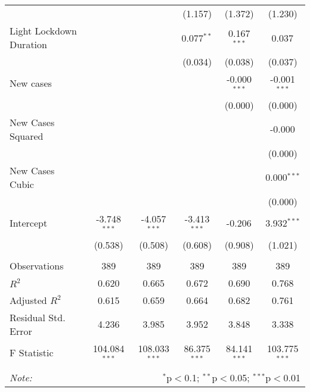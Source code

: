 \begin{tabular}{@{\extracolsep{5pt}}lccccc}
  & & & (1.157) & (1.372) & (1.230) \\
 Light Lockdown Duration & & & 0.077$^{**}$ & 0.167$^{***}$ & 0.037$^{}$ \\
  & & & (0.034) & (0.038) & (0.037) \\
 New cases & & & & -0.000$^{***}$ & -0.001$^{***}$ \\
  & & & & (0.000) & (0.000) \\
 New Cases Squared & & & & & -0.000$^{}$ \\
  & & & & & (0.000) \\
 New Cases Cubic & & & & & 0.000$^{***}$ \\
  & & & & & (0.000) \\
 Intercept & -3.748$^{***}$ & -4.057$^{***}$ & -3.413$^{***}$ & -0.206$^{}$ & 3.932$^{***}$ \\
  & (0.538) & (0.508) & (0.608) & (0.908) & (1.021) \\
\hline \\[-1.8ex]
 Observations & 389 & 389 & 389 & 389 & 389 \\
 $R^2$ & 0.620 & 0.665 & 0.672 & 0.690 & 0.768 \\
 Adjusted $R^2$ & 0.615 & 0.659 & 0.664 & 0.682 & 0.761 \\
 Residual Std. Error & 4.236 & 3.985 & 3.952 & 3.848 & 3.338  \\
 F Statistic & 104.084$^{***}$  & 108.033$^{***}$  & 86.375$^{***}$  & 84.141$^{***}$  & 103.775$^{***}$  \\
\hline
\hline \\[-1.8ex]
\textit{Note:} & \multicolumn{5}{r}{$^{*}$p$<$0.1; $^{**}$p$<$0.05; $^{***}$p$<$0.01} \\
\end{tabular}
